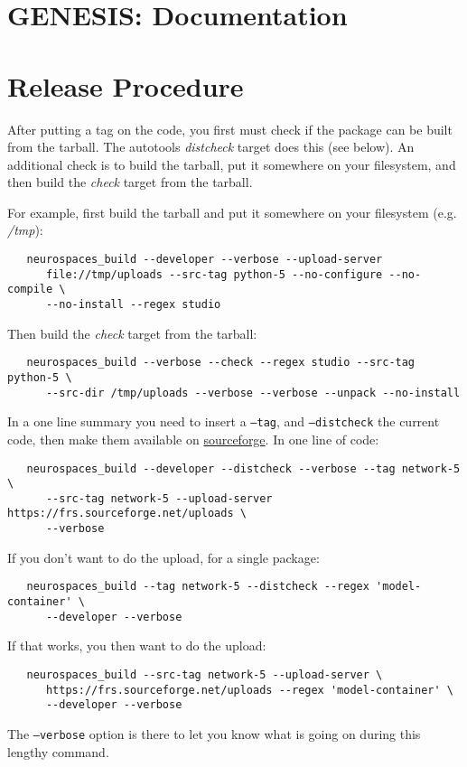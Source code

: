 \documentclass[12pt]{article}
\begin{document}
\section*{GENESIS: Documentation}

\section*{Release Procedure}

After putting a tag on the code, you first must check if the package can be built from the tarball. The autotools {\it distcheck} target does this (see below). An additional check is to build the tarball, put it somewhere on your filesystem, and then build the {\it check} target from the tarball. 

For example, first build the tarball and put it somewhere on your filesystem (e.g. {\it /tmp}):
\begin{verbatim}
   neurospaces_build --developer --verbose --upload-server 
      file://tmp/uploads --src-tag python-5 --no-configure --no-compile \
      --no-install --regex studio
\end{verbatim}
Then build the {\it check} target from the tarball:
\begin{verbatim}
   neurospaces_build --verbose --check --regex studio --src-tag python-5 \
      --src-dir /tmp/uploads --verbose --verbose --unpack --no-install
\end{verbatim}

In a one line summary you need to insert a {\tt --tag}, and {\tt --distcheck} the current code, then make them available on \href{http://sourceforge.net/projects/neurospaces/}{sourceforge}. In one line of code:
\begin{verbatim}
   neurospaces_build --developer --distcheck --verbose --tag network-5 \
      --src-tag network-5 --upload-server https://frs.sourceforge.net/uploads \
      --verbose
\end{verbatim}
If you don't want to do the upload, for a single package:
\begin{verbatim}
   neurospaces_build --tag network-5 --distcheck --regex 'model-container' \
      --developer --verbose
\end{verbatim}
If that works, you then want to do the upload:
\begin{verbatim}
   neurospaces_build --src-tag network-5 --upload-server \
      https://frs.sourceforge.net/uploads --regex 'model-container' \
      --developer --verbose
\end{verbatim}
The {\tt --verbose} option is there to let you know what is going on during this lengthy command.
\end{document}
